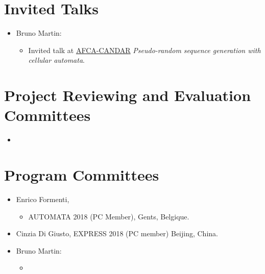 \documentclass[a4paper]{article}
\begin{document}
\section{Invited Talks}

\begin{itemize}
 \item Bruno Martin:
 \begin{itemize}
     \item Invited talk at \href{https://is-candar.org/afca18}{AFCA-CANDAR} \emph{Pseudo-random sequence generation with cellular automata}.
 \end{itemize}
\end{itemize}

\section{Project Reviewing and Evaluation Committees}

\begin{itemize}
\item
 \end{itemize}
 


\section{Program Committees}

\begin{itemize}


\item Enrico Formenti, 
\begin{itemize}
\item AUTOMATA 2018 (PC Member), Gents, Belgique.
\end{itemize}
\item Cinzia Di Giusto, EXPRESS 2018 (PC member) Beijing, China.
 \item Bruno Martin:
 \begin{itemize}
     \item 
 \end{itemize}
\end{itemize}
\end{document}
